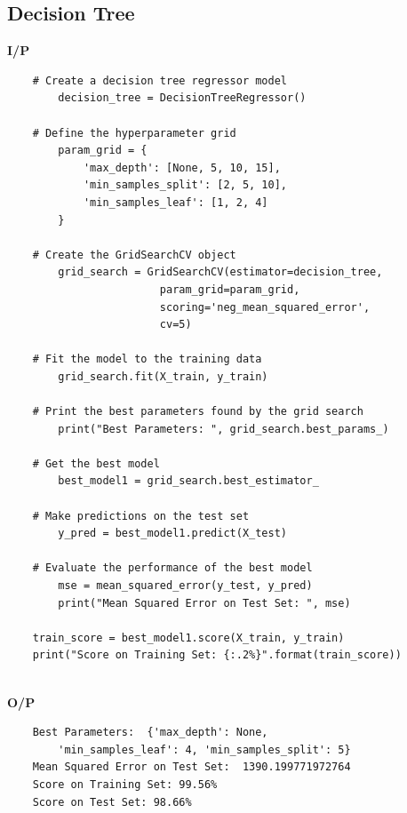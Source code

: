 \subsection{Decision Tree}
\noindent
\textbf{I/P} \\[-1.5em]
\begin{verbatim}
    # Create a decision tree regressor model 
        decision_tree = DecisionTreeRegressor() 
 
    # Define the hyperparameter grid 
        param_grid = { 
            'max_depth': [None, 5, 10, 15], 
            'min_samples_split': [2, 5, 10], 
            'min_samples_leaf': [1, 2, 4] 
        } 
 
    # Create the GridSearchCV object 
        grid_search = GridSearchCV(estimator=decision_tree,
                        param_grid=param_grid,
                        scoring='neg_mean_squared_error',
                        cv=5) 
 
    # Fit the model to the training data 
        grid_search.fit(X_train, y_train) 
 
    # Print the best parameters found by the grid search 
        print("Best Parameters: ", grid_search.best_params_) 
 
    # Get the best model 
        best_model1 = grid_search.best_estimator_ 
 
    # Make predictions on the test set 
        y_pred = best_model1.predict(X_test) 
 
    # Evaluate the performance of the best model 
        mse = mean_squared_error(y_test, y_pred) 
        print("Mean Squared Error on Test Set: ", mse) 
 
    train_score = best_model1.score(X_train, y_train) 
    print("Score on Training Set: {:.2%}".format(train_score)) 
\end{verbatim}
\\
\noindent
\textbf{O/P} \\[-1.5em]
\begin{verbatim}
    Best Parameters:  {'max_depth': None,
        'min_samples_leaf': 4, 'min_samples_split': 5} 
    Mean Squared Error on Test Set:  1390.199771972764 
    Score on Training Set: 99.56% 
    Score on Test Set: 98.66%  
\end{verbatim}
